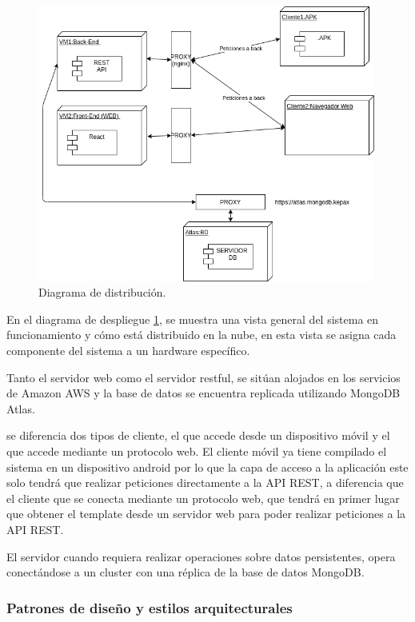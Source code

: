 \documentclass{article}
\begin{document}
\begin{figure}[H]
    \centering
        \includegraphics[width=0.99\textwidth]{../images/despliegue.png}
    \caption{Diagrama de distribución.}
    \label{despliegue}
\end{figure}

En el diagrama de despliegue \ref{despliegue}, se muestra una vista general del sistema en funcionamiento y cómo está distribuido en la nube, en esta vista se asigna cada componente del sistema a un hardware específico.

Tanto el servidor web como el servidor restful, se sitúan alojados en los servicios de Amazon AWS y la base de datos se encuentra replicada utilizando MongoDB Atlas.

se diferencia dos tipos de cliente, el que accede desde un dispositivo móvil y el que accede mediante un protocolo web. El cliente móvil ya tiene compilado el sistema en un dispositivo android por lo que la capa de acceso a la aplicación este solo tendrá que realizar peticiones directamente a la API REST, a diferencia que el cliente que se conecta mediante un protocolo web, que tendrá en primer lugar que obtener el template desde un servidor web para poder realizar peticiones a la API REST.

El servidor cuando requiera realizar operaciones sobre datos persistentes, opera conectándose a un cluster con una réplica de la base de datos MongoDB.

\pagebreak

\subsubsection*{Patrones de diseño y estilos arquitecturales}
\end{document}
